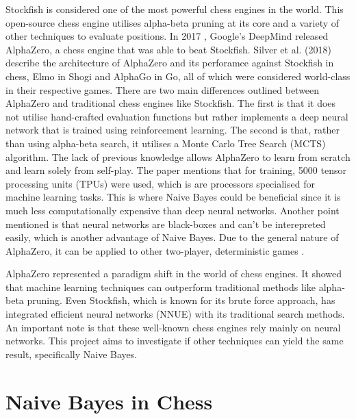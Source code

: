 Stockfish is considered one of the most powerful chess engines in the world. This open-source chess engine utilises alpha-beta pruning at its core and a variety of other techniques to evaluate positions. In 2017 , Google's DeepMind released AlphaZero, a chess engine that was able to beat Stockfish. Silver et al. (2018) \cite{silverGeneralReinforcementLearning2018} describe the architecture of AlphaZero and its perforamce against Stockfish in chess, Elmo in Shogi and AlphaGo in Go, all of which were considered world-class in their respective games. There are two main differences outlined between AlphaZero and traditional chess engines like Stockfish. The first is that it does not utilise hand-crafted evaluation functions but rather implements a deep neural network that is trained using reinforcement learning. The second is that, rather than using alpha-beta search, it utilises a Monte Carlo Tree Search (MCTS) algorithm. The lack of previous knowledge allows AlphaZero to learn from scratch and learn solely from self-play. The paper mentions that for training, 5000 tensor processing units (TPUs) were used, which is are processors specialised for machine learning tasks. This is where Naive Bayes could be beneficial since it is much less computationally expensive than deep neural networks. Another point mentioned is that neural networks are black-boxes and can't be interepreted easily, which is another advantage of Naive Bayes. Due to the general nature of AlphaZero, it can be applied to other two-player, deterministic games \cite{kleinNeuralNetworksChess2022}.



AlphaZero represented a paradigm shift in the world of chess engines. It showed that machine learning techniques can outperform traditional methods like alpha-beta pruning. Even Stockfish, which is known for its brute force approach, has integrated efficient neural networks (NNUE) with its traditional search methods. An important note is that these well-known chess engines rely mainly on neural networks. This project aims to investigate if other techniques can yield the same result, specifically Naive Bayes. 


\section{Naive Bayes in Chess}

